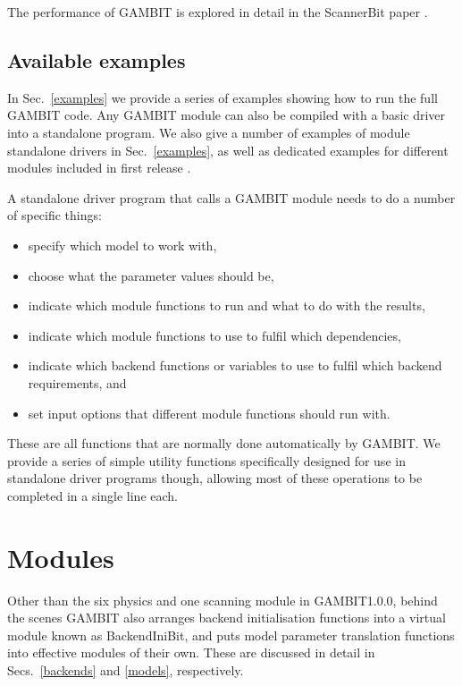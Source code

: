 \documentclass[pdftex,twocolumn,epjc3_preprint,runningheads]{svjour3}
\renewcommand{\_}{\discretionary{\underscore}{}{\underscore}}
\newcommand{\gambit}{\textsf{GAMBIT}\xspace}
\newcommand{\scannerbit}{\textsf{ScannerBit}\xspace}
\newcommand{\GB}{\gambit}
\begin{document}
The performance of \GB is explored in detail in the \scannerbit paper \cite{ScannerBit}.

\subsection{Available examples}

In Sec.\ \ref{examples} we provide a series of examples showing how to run the full \GB code.  Any \GB module can also be compiled with a basic driver into a standalone program.  We also give a number of examples of module standalone drivers in Sec.\ \ref{examples}, as well as dedicated examples for different modules included in first release \cite{DarkBit,ColliderBit,ScannerBit,FlavBit,SDPBit}.

A standalone driver program that calls a \GB module needs to do a number of specific things:
\begin{itemize}
\item specify which model to work with,
\item choose what the parameter values should be,
\item indicate which module functions to run and what to do with the results,
\item indicate which module functions to use to fulfil which dependencies,
\item indicate which backend functions or variables to use to fulfil which backend requirements, and
\item set input options that different module functions should run with.
\end{itemize}
These are all functions that are normally done automatically by \GB.  We provide a series of simple utility functions specifically designed for use in standalone driver programs though, allowing most of these operations to be completed in a single line each.

\section{Modules}
\label{modules}

Other than the six physics and one scanning module in \GB \textsf{1.0.0}, behind the scenes \GB also arranges backend initialisation functions into a virtual module known as \textsf{BackendIniBit}, and puts model parameter translation functions into effective modules of their own.  These are discussed in detail in Secs.\ \ref{backends} and \ref{models}, respectively.
\end{document}
